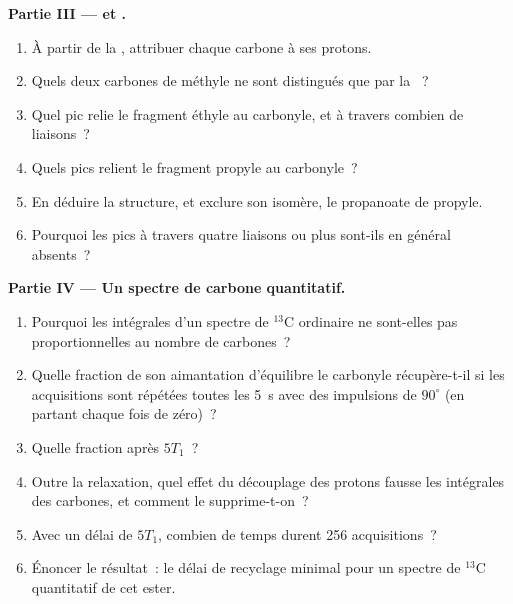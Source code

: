 \begin{problem}
\medskip\noindent\textbf{Partie III ---  et .}
\begin{enumerate}[resume]
  \item À partir de la , attribuer chaque carbone à ses protons.
  \item Quels deux carbones de méthyle ne sont distingués que par la
        ~?
  \item Quel pic  relie le fragment éthyle au carbonyle, et à travers
        combien de liaisons~?
  \item Quels pics  relient le fragment propyle au carbonyle~?
  \item En déduire la structure, et exclure son isomère, le propanoate de
        propyle.
  \item Pourquoi les pics  à travers quatre liaisons ou plus sont-ils
        en général absents~?
\end{enumerate}

\medskip\noindent\textbf{Partie IV --- Un spectre de carbone quantitatif.}
\begin{enumerate}[resume]
  \item Pourquoi les intégrales d'un spectre de ${}^{13}$C ordinaire ne
        sont-elles pas proportionnelles au nombre de carbones~?
  \item Quelle fraction de son aimantation d'équilibre le carbonyle
        récupère-t-il si les acquisitions sont répétées toutes les
        \qty{5}{s} avec des impulsions de $90^\circ$ (en partant chaque
        fois de zéro)~?
  \item Quelle fraction après $5T_1$~?
  \item Outre la relaxation, quel effet du découplage des protons fausse
        les intégrales des carbones, et comment le supprime-t-on~?
  \item Avec un délai de $5T_1$, combien de temps durent 256
        acquisitions~?
  \item Énoncer le résultat~: le délai de recyclage minimal pour un
        spectre de ${}^{13}$C quantitatif de cet ester.
\end{enumerate}
\end{problem}
